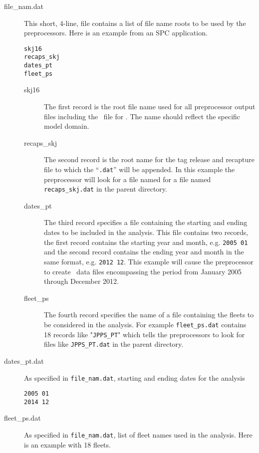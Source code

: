 \begin{description}
\item[file\_nam.dat] This short, 4-line, file contains a list of 
file name roots to be used by the
preprocessors. Here is an example from an SPC application.
{\par{}\normalbaselineskip
\begin{verbatim}
skj16
recaps_skj
dates_pt 
fleet_ps
\end{verbatim}
\par}
\begin{description}
  \item[skj16] The first record is the root file name used for all
preprocessor output files including the \PAR\ file for \TT. The name should
reflect the specific model domain.
  \item[recaps\_skj] The second record is the root name for the tag
release and recapture file to which the ``{\tt .dat}'' will be
appended. In this example the preprocessor will look for a file named 
for a file named {\tt recaps\_skj.dat} in the parent directory.
  \item[dates\_pt] The third record specifies a file containing 
the starting and ending dates to
be included in the analysis. This file contains two records, the first
record contains the starting year and month, e.g. {\tt 2005 01} and
the second record contains the ending year and month in the same
format, e.g. {\tt 2012 12}. This example will cause the preprocessor
to create \TT\ data files encompassing the period from January
2005 through December 2012.
  \item[fleet\_ps] The fourth record specifies the name of a
file containing the fleets to be
considered in the analysis. For example {\tt fleet\_ps.dat} contains
18 records like "{\tt JPPS\_PT}" which tells the preprocessors to look
for files like {\tt JPPS\_PT.dat} in the parent directory.
\end{description}
\item[dates\_pt.dat] As specified in {\tt file\_nam.dat}, starting and
ending dates for the analysis
{\par{}\normalbaselineskip
\begin{verbatim}
2005 01
2014 12
\end{verbatim}
\par}
\item[fleet\_ps.dat]  As specified in {\tt file\_nam.dat}, list of
fleet names used in the analysis. Here is an example with 18 fleets.
{\par{}\normalbaselineskip
}
\end{description}
